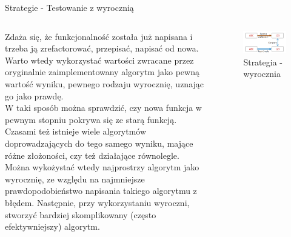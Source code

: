 \begin{frame}{Strategie - Testowanie z wyrocznią}
    \begin{columns}[t]
            Zdaża się, że funkcjonalność została już napisana i trzeba ją zrefactorować, przepisać, napisać od nowa. Warto wtedy wykorzystać wartości zwracane przez oryginalnie zaimplementowany algorytm jako pewną wartość wyniku, pewnego rodzaju wyrocznię, uznając go jako prawdę. \pause\\
            W taki sposób można sprawdzić, czy nowa funkcja w pewnym stopniu pokrywa się ze starą funkcją. Czasami też istnieje wiele algorytmów doprowadzających do tego samego wyniku, mające różne złożoności, czy też działające równolegle. \pause\\
            Można wykożystać wtedy najprostrzy algorytm jako wyrocznię, ze względu na najmniejsze prawdopodobieństwo napisania takiego algorytmu z błędem. Następnie, przy wykorzystaniu wyroczni, stworzyć bardziej skomplikowany (często efektywniejszy) algorytm.
        \centering
        \begin{figure}
            \centering
            \includegraphics[width=1\textwidth]{images/property_test_oracle.png}
            \caption{Strategia - wyrocznia}
            \label{fig:oracle_strategy}
        \end{figure}    
    \end{columns}
\end{frame}